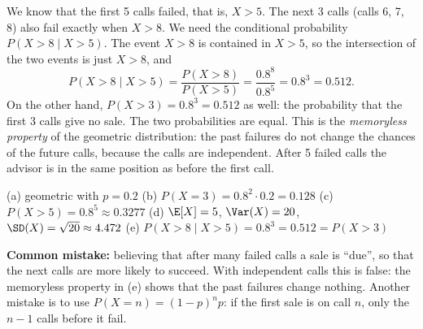 \begin{solution}
	 We know that the first 5 calls failed, that is, $X>5$. The next
	3 calls (calls 6, 7, 8) also fail exactly when $X>8$. We need the
	conditional probability $P(X>8\mid X>5)$. The event $X>8$ is contained in
	$X>5$, so the intersection of the two events is just $X>8$, and
	\[ P(X>8\mid X>5)=\frac{P(X>8)}{P(X>5)}=\frac{0.8^8}{0.8^5}=0.8^3=0.512. \]
	On the other hand, $P(X>3)=0.8^3=0.512$ as well: the probability that the
	first 3 calls give no sale. The two probabilities are equal.
	This is the \emph{memoryless property} of the geometric distribution: the
	past failures do not change the chances of the future calls, because the
	calls are independent. After 5 failed calls the advisor is in the same
	position as before the first call.
	\begin{answer}
		(a) geometric with $p=0.2$ \quad
		(b) $P(X=3)=0.8^2\cdot0.2=0.128$ \quad
		(c) $P(X>5)=0.8^5\approx0.3277$ \quad
		(d) $\E[X]=5$, $\Var(X)=20$, $\SD(X)=\sqrt{20}\approx4.472$ \quad
		(e) $P(X>8\mid X>5)=0.8^3=0.512=P(X>3)$
	\end{answer}
	\begin{remark}
		\textbf{Common mistake:} believing that after many failed calls a sale
		is ``due'', so that the next calls are more likely to succeed. With
		independent calls this is false: the memoryless property in (e) shows
		that the past failures change nothing. Another mistake is to use
		$P(X=n)=(1-p)^n p$: if the first sale is on call $n$, only the $n-1$
		calls before it fail.
	\end{remark}
\end{solution}
